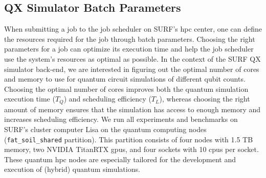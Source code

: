 \subsection{QX Simulator Batch Parameters}
When submitting a job to the job scheduler on SURF's \gls{hpc} center, one can define the resources required for the job through batch parameters.
Choosing the right parameters for a job can optimize its execution time and help the job scheduler use the system's resources as optimal as possible.
In the context of the SURF QX simulator back-end, we are interested in figuring out the optimal number of cores and memory to use for quantum circuit simulations of different qubit counts.
Choosing the optimal number of cores improves both the quantum simulation execution time ($T_Q$) and scheduling efficiency ($T_L$), whereas choosing the right amount of memory ensures that the simulation has access to enough memory and increases scheduling efficiency.
We run all experiments and benchmarks on SURF's cluster computer Lisa on the quantum computing nodes (\texttt{fat_soil_shared} partition).
This partition consists of four nodes with 1.5 TB memory, two NVIDIA TitanRTX \glspl{gpu}, and four sockets with 10 \glspl{cpu} per socket.
These quantum \gls{hpc} nodes are especially tailored for the development and execution of (hybrid) quantum simulations.


